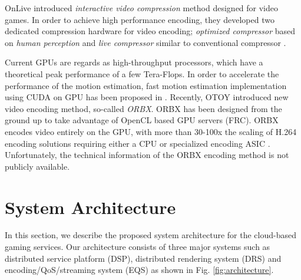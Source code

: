 \documentclass[conference]{IEEEtran}
\begin{document}
    OnLive introduced \emph{interactive video compression} method designed for video games.
    In order to achieve high performance encoding, they developed two dedicated compression hardware for video encoding;
    \emph{optimized compressor} based on \emph{human perception} and \emph{live compressor} similar to conventional compressor \cite{Perlman:2009}.

    Current GPUs are regards as high-throughput processors, which have a theoretical peak performance of a few Tera-Flops. In order to accelerate the performance of the motion estimation, fast motion estimation implementation using CUDA on GPU has been proposed in \cite{Colic:2010}.
    Recently, OTOY introduced new video encoding method, so-called \emph{ORBX}.
    ORBX has been designed from the ground up to take advantage of OpenCL based GPU servers (FRC). ORBX encodes video entirely on the GPU, with more than 30-100x the scaling of H.264 encoding solutions requiring either a CPU or specialized encoding ASIC \cite{OTOY:2009}.
    Unfortunately, the technical information of the ORBX encoding method is not publicly available.

    \section{System Architecture}
    \label{sc:Architecture}
    In this section, we describe the proposed system architecture for the cloud-based gaming services.
    Our architecture consists of three major systems such as distributed service platform (DSP), distributed rendering system (DRS) and encoding/QoS/streaming system (EQS) as shown in Fig. \ref{fig:architecture}.
\end{document}
